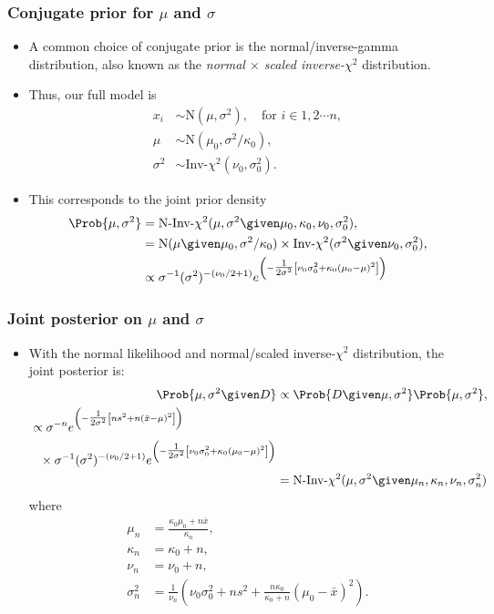 \begin{frame}
	\frametitle{Conjugate prior for $\mu$ and $\sigma$}
	\begin{itemize}
		\item A common choice of conjugate prior is the normal/inverse-gamma distribution, also known as the \emph{normal $\times$ scaled inverse-$\chi^2$} distribution.
		\item Thus, our full model is 
			\begin{align*}
				x_i &\sim \textrm{N}(\mu, \sigma^2), \quad\text{for $i\in 1, 2 \cdots n$},\\
				\mu &\sim \textrm{N}(\mu_0, \sigma^2/\kappa_0),\\
				\sigma^2 &\sim \textrm{Inv-}\chi^2(\nu_0, \sigma^2_0).
			\end{align*}
		\item This corresponds to the joint prior density 
			\begin{align*}
				\Prob{\mu,\sigma^2} &= \textrm{N-Inv-}\chi^2(\mu, \sigma^2 \given \mu_0, \kappa_0, \nu_0, \sigma^2_0),\\
				&=\textrm{N}(\mu \given \mu_0, \sigma^2/\kappa_0) \times \textrm{Inv-}\chi^2(\sigma^2\given\nu_0, \sigma^2_0),\\
				&\propto\sigma^{-1}(\sigma^2)^{-(\nu_0/2+1)} e^{\left(-\tfrac{1}{2\sigma^2}\left[ \nu_0\sigma^2_0 + \kappa_0(\mu_0  - \mu)^2 \right]\right)}
			\end{align*}
	\end{itemize}
\end{frame}
\begin{frame}
	\frametitle{Joint posterior on $\mu$ and $\sigma$}
	\begin{itemize}
		\item With the normal likelihood and normal/scaled inverse-$\chi^2$ distribution, the joint posterior is:
			\begin{align*}
				\Prob{\mu, \sigma^2 \given D} &\propto \Prob{D\given \mu, \sigma^2} \Prob{\mu,\sigma^2},\\
				\begin{split}
				&\propto\sigma^{-n} e^{\left( -\tfrac{1}{2\sigma^2}\left[n s^2 + n(\bar{x}-\mu)^2\right] \right)}\\
				&\phantom{\propto}\times \sigma^{-1}(\sigma^2)^{-(\nu_0/2+1)} e^{\left(-\tfrac{1}{2\sigma^2}\left[ \nu_0\sigma^2_0 + \kappa_0(\mu_0  - \mu)^2 \right]\right)}
				\end{split}\\
				& = \textrm{N-Inv-}\chi^2(\mu, \sigma^2 \given \mu_n, \kappa_n, \nu_n, \sigma_n^2)
			\end{align*}
		where 
		\begin{align*}
			\mu_n &= \frac{\kappa_0\mu_0 + n\bar{x}}{\kappa_n},\\
			 \kappa_n     &= \kappa_0 + n,\\
			 \nu_n &= \nu_0 + n,\\
			 \sigma_n^2 &= \frac{1}{\nu_n}\left( \nu_0\sigma_0^2 + ns^2 + \frac{n\kappa_0}{\kappa_0 + n}(\mu_0 - \bar{x})^2\right).
		\end{align*}
	\end{itemize}
\end{frame}


